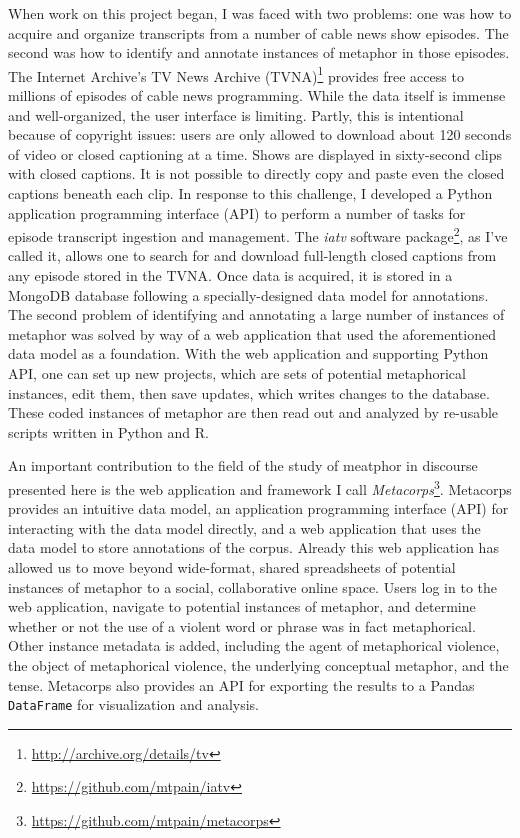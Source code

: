 When work on this project began, I was faced with two problems: one was how to
acquire and organize transcripts from a number of cable news show episodes. The second was 
how to identify and annotate instances of metaphor in those episodes. The Internet
Archive's TV News Archive (TVNA)\footnote{\url{http://archive.org/details/tv}} 
provides free access to millions of episodes of cable news programming. While 
the data itself is immense and well-organized, the user interface is limiting.
Partly, this is intentional because of copyright issues: users are only allowed
to download about 120 seconds of video or closed captioning at a time. Shows
are displayed in sixty-second clips with closed captions. It is not possible to
directly copy and paste even the closed captions beneath each clip. In response
to this challenge, I developed a Python application programming interface (API)
to perform a number of tasks for episode transcript ingestion and management.
The \textit{iatv} software package\footnote{\url{https://github.com/mtpain/iatv}}, 
as I've called it, allows one to 
search for and download full-length closed captions from any episode stored in
the TVNA. Once data is acquired, it is stored in a MongoDB database following a
specially-designed data model for annotations. The second problem of 
identifying and annotating a large number of instances of metaphor was solved
by way of a web application that used the aforementioned data model as a foundation.
With the web application and supporting Python API, one can set up new projects,
which are sets of potential metaphorical instances, edit them, then save updates, which
writes changes to the database. These coded instances of metaphor are then 
read out and analyzed by re-usable scripts written in Python and R.

An important contribution to the field of the study of meatphor in discourse
presented here is the web application and framework I call \textit{Metacorps}\footnote{\url{https://github.com/mtpain/metacorps}}.
Metacorps provides an intuitive data model, an application programming interface
(API) for interacting with the data model directly, and a web application that
uses the data model to store annotations of the corpus. Already this web application
has allowed us to move beyond wide-format, shared spreadsheets of potential
instances of metaphor to a social, collaborative online space. Users log in
to the web application, navigate to potential instances of metaphor, and 
determine whether or not the use of a violent word or phrase was in fact
metaphorical. Other instance metadata is added, including the agent of metaphorical violence,
the object of metaphorical violence, the underlying conceptual metaphor, and 
the tense. Metacorps also provides an API for exporting the results to a 
Pandas \texttt{DataFrame} for visualization and analysis. 

